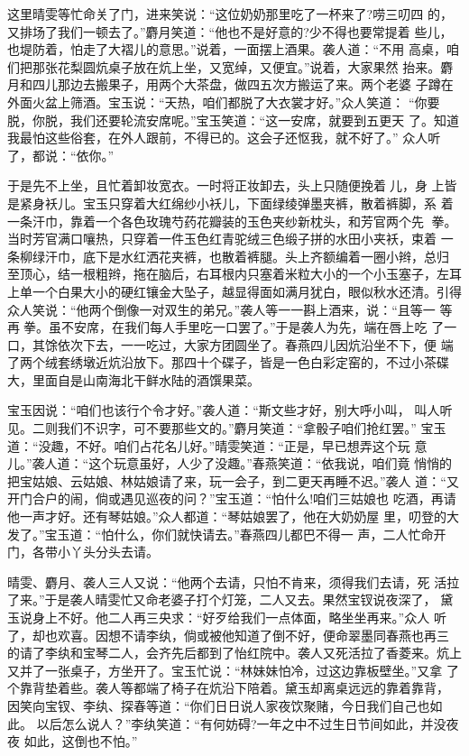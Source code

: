 这里晴雯等忙命关了门，进来笑说：“这位奶奶那里吃了一杯来了?唠三叨四
的，又排场了我们一顿去了。”麝月笑道：“他也不是好意的?少不得也要常提着
些儿，也堤防着，怕走了大褶儿的意思。”说着，一面摆上酒果。袭人道：“不用
高桌，咱们把那张花梨圆炕桌子放在炕上坐，又宽绰，又便宜。”说着，大家果然
抬来。麝月和四儿那边去搬果子，用两个大茶盘，做四五次方搬运了来。两个老婆
子蹲在外面火盆上筛酒。宝玉说：“天热，咱们都脱了大衣裳才好。”众人笑道：
“你要脱，你脱，我们还要轮流安席呢。”宝玉笑道：“这一安席，就要到五更天
了。知道我最怕这些俗套，在外人跟前，不得已的。这会子还怄我，就不好了。”
众人听了，都说：“依你。”

于是先不上坐，且忙着卸妆宽衣。一时将正妆卸去，头上只随便挽着儿，身
上皆是紧身袄儿。宝玉只穿着大红绵纱小袄儿，下面绿绫弹墨夹裤，散着裤脚，系
着一条汗巾，靠着一个各色玫瑰芍药花瓣装的玉色夹纱新枕头，和芳官两个先
拳。当时芳官满口嚷热，只穿着一件玉色红青驼绒三色缎子拼的水田小夹袄，束着
一条柳绿汗巾，底下是水红洒花夹裤，也散着裤腿。头上齐额编着一圈小辫，总归
至顶心，结一根粗辫，拖在脑后，右耳根内只塞着米粒大小的一个小玉塞子，左耳
上单一个白果大小的硬红镶金大坠子，越显得面如满月犹白，眼似秋水还清。引得
众人笑说：“他两个倒像一对双生的弟兄。”袭人等一一斟上酒来，说：“且等一
等再拳。虽不安席，在我们每人手里吃一口罢了。”于是袭人为先，端在唇上吃
了一口，其馀依次下去，一一吃过，大家方团圆坐了。春燕四儿因炕沿坐不下，便
端了两个绒套绣墩近炕沿放下。那四十个碟子，皆是一色白彩定窑的，不过小茶碟
大，里面自是山南海北干鲜水陆的酒馔果菜。

宝玉因说：“咱们也该行个令才好。”袭人道：“斯文些才好，别大呼小叫，
叫人听见。二则我们不识字，可不要那些文的。”麝月笑道：“拿骰子咱们抢红罢。”
宝玉道：“没趣，不好。咱们占花名儿好。”晴雯笑道：“正是，早已想弄这个玩
意儿。”袭人道：“这个玩意虽好，人少了没趣。”春燕笑道：“依我说，咱们竟
悄悄的把宝姑娘、云姑娘、林姑娘请了来，玩一会子，到二更天再睡不迟。”袭人
道：“又开门合户的闹，倘或遇见巡夜的问？”宝玉道：“怕什么!咱们三姑娘也
吃酒，再请他一声才好。还有琴姑娘。”众人都道：“琴姑娘罢了，他在大奶奶屋
里，叨登的大发了。”宝玉道：“怕什么，你们就快请去。”春燕四儿都巴不得一
声，二人忙命开门，各带小丫头分头去请。

晴雯、麝月、袭人三人又说：“他两个去请，只怕不肯来，须得我们去请，死
活拉了来。”于是袭人晴雯忙又命老婆子打个灯笼，二人又去。果然宝钗说夜深了，
黛玉说身上不好。他二人再三央求：“好歹给我们一点体面，略坐坐再来。”众人
听了，却也欢喜。因想不请李纨，倘或被他知道了倒不好，便命翠墨同春燕也再三
的请了李纨和宝琴二人，会齐先后都到了怡红院中。袭人又死活拉了香菱来。炕上
又并了一张桌子，方坐开了。宝玉忙说：“林妹妹怕冷，过这边靠板壁坐。”又拿
了个靠背垫着些。袭人等都端了椅子在炕沿下陪着。黛玉却离桌远远的靠着靠背，
因笑向宝钗、李纨、探春等道：“你们日日说人家夜饮聚赌，今日我们自己也如此。
以后怎么说人？”李纨笑道：“有何妨碍?一年之中不过生日节间如此，并没夜夜
如此，这倒也不怕。”

